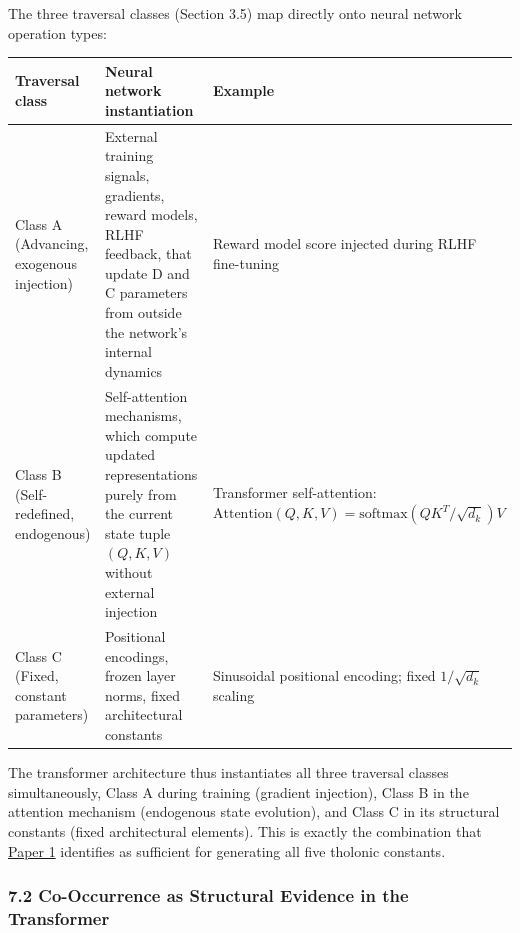 \documentclass[
  11pt,
  letterpaper,
]{article}
\begin{document}
The three traversal classes (Section 3.5) map directly onto neural
network operation types:

\begin{longtable}[]{@{}
  >{\raggedright\arraybackslash}p{}
  >{\raggedright\arraybackslash}p{}
  >{\raggedright\arraybackslash}p{}@{}}
\toprule\noalign{}
\begin{minipage}[b]{\linewidth}\raggedright
Traversal class
\end{minipage} & \begin{minipage}[b]{\linewidth}\raggedright
Neural network instantiation
\end{minipage} & \begin{minipage}[b]{\linewidth}\raggedright
Example
\end{minipage} \\
\midrule\noalign{}
\endhead
\bottomrule\noalign{}
\endlastfoot
Class A (Advancing, exogenous injection) & External training signals,
gradients, reward models, RLHF feedback, that update D and C parameters
from outside the network's internal dynamics & Reward model score
injected during RLHF fine-tuning \\
Class B (Self-redefined, endogenous) & Self-attention mechanisms, which
compute updated representations purely from the current state tuple
\((Q, K, V)\) without external injection & Transformer self-attention:
\(\text{Attention}(Q,K,V) = \text{softmax}(QK^T/\sqrt{d_k})V\) \\
Class C (Fixed, constant parameters) & Positional encodings, frozen
layer norms, fixed architectural constants & Sinusoidal positional
encoding; fixed \(1/\sqrt{d_k}\) scaling \\
\end{longtable}

The transformer architecture thus instantiates all three traversal
classes simultaneously, Class A during training (gradient injection),
Class B in the attention mechanism (endogenous state evolution), and
Class C in its structural constants (fixed architectural elements). This
is exactly the combination that
\href{https://github.com/baardev/truevalue/blob/main/docnav/Research/papers/1_recursive-tholonic-five-constants/1_recursive-tholonic-five-constants.pdf}{Paper
1} identifies as sufficient for generating all five tholonic constants.

\subsubsection{7.2 Co-Occurrence as Structural Evidence in the
Transformer}\label{co-occurrence-as-structural-evidence-in-the-transformer}
\end{document}
